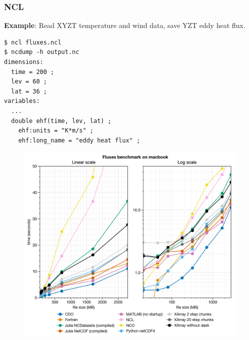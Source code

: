 \documentclass[aspectratio=169]{beamer}
\makeatletter
\newcommand{\verbatimfont}[1]{\renewcommand{\verbatim@font}{\ttfamily#1}}
\makeatother
\begin{document}
\begin{frame}[fragile]
  \frametitle{NCL}

  \textbf{Example}: Read XYZT temperature and wind data, save YZT eddy heat flux.

  \verbatimfont{\footnotesize}%
\begin{verbatim}
$ ncl fluxes.ncl
$ ncdump -h output.nc
dimensions:
  time = 200 ;
  lev = 60 ;
  lat = 36 ;
variables:
  ...
  double ehf(time, lev, lat) ;
    ehf:units = "K*m/s" ;
    ehf:long_name = "eddy heat flux" ;
\end{verbatim}

\end{frame}


\begin{frame}[plain]
  \begin{figure}
    \centering
    \includegraphics[height=1.1\textheight]{fluxes_60lev_uriah.png}
  \end{figure}
\end{frame}
\end{document}
